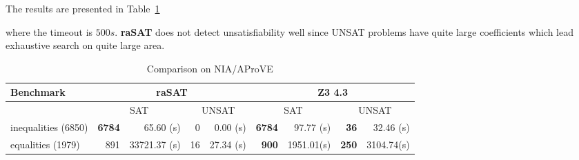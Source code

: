 \documentclass[runningheads,a4paper,oribibl]{llncs}
\newcommand{\suppress}[1]{} %
\begin{document}
The results are presented in Table~\ref{tab:aprove}
\suppress{
\begin{itemize}
\item {\bf raSAT} detects 6773 SAT in 90.22s, and 2 UNSAT in 378.04s. 
\item {\bf Z3 4.3} detects 6784 SAT in 97.70s, and 36 UNSAT in 32.08s. 
\end{itemize}
}
where the timeout is $500s$. 
{\bf raSAT} does not detect unsatisfiability well since UNSAT problems have quite large coefficients
which lead exhaustive search on quite large area.

\begin{table}[t]
\centering
\begin{tabular}{ | l | r | r | r | r  | r | r | r | r |}
\hline
    \multicolumn{1}{|l|}{Benchmark} & 
    \multicolumn{4}{c|}{\bf raSAT} & \multicolumn{4}{c|}{\bf Z3 4.3}\\
\hline
    & \multicolumn{2}{c}{SAT} & \multicolumn{2}{|c}{UNSAT} 
    & \multicolumn{2}{|c}{SAT} & \multicolumn{2}{|c|}{UNSAT} \\
\hline
inequalities (6850) & \textbf{6784} & 65.60 (s) & 0 & 0.00 (s) & \textbf{6784} & 97.77 (s) & \textbf{36} & 32.46 (s) 
\\
\hline
equalities (1979) & 891 & 33721.37 (s) & 16 & 27.34 (s) & \textbf{900} & 1951.01(s) & \textbf{250} & 3104.74(s) 
\\
\hline
\end{tabular}
\medskip 
\caption{Comparison on NIA/AProVE} \label{tab:aprove}
\end{table}
\end{document}
